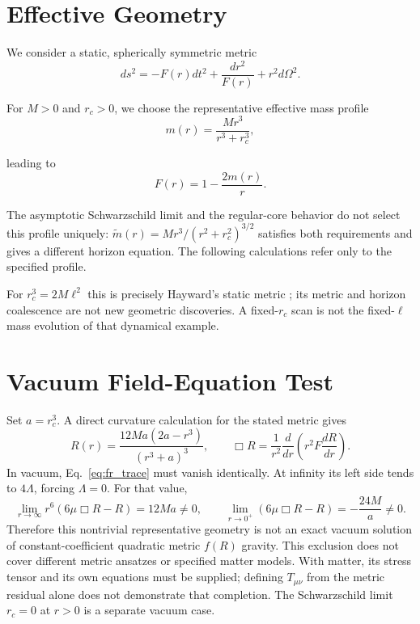 \documentclass[11pt,final]{article}
\begin{document}
\section{Effective Geometry}

We consider a static, spherically symmetric metric
\begin{equation}
ds^2=-F(r)dt^2+\frac{dr^2}{F(r)}+r^2d\Omega^2.
\end{equation}

For $M>0$ and $r_c>0$, we choose the representative effective mass profile
\begin{equation}
m(r)=\frac{Mr^3}{r^3+r_c^3},
\end{equation}

leading to
\begin{equation}
F(r)=1-\frac{2m(r)}{r}.
\end{equation}


The asymptotic Schwarzschild limit and the regular-core behavior do not select
this profile uniquely: $\widetilde m(r)=Mr^3/(r^2+r_c^2)^{3/2}$ satisfies both
requirements and gives a different horizon equation. The following calculations
refer only to the specified profile.

For $r_c^3=2M\ell^2$ this is precisely Hayward's static metric
\cite{hayward2006}; its metric and horizon coalescence are not new geometric
discoveries. A fixed-$r_c$ scan is not the fixed-$\ell$ mass evolution of that
dynamical example.

\section{Vacuum Field-Equation Test}

Set $a=r_c^3$. A direct curvature calculation for the stated metric gives
\begin{equation}
R(r)=\frac{12Ma(2a-r^3)}{(r^3+a)^3},\qquad
\Box R=\frac{1}{r^2}\frac{d}{dr}\left(r^2F\frac{dR}{dr}\right).
\end{equation}
In vacuum, Eq.~\eqref{eq:fr_trace} must vanish identically. At infinity its
left side tends to $4\Lambda$, forcing $\Lambda=0$. For that value,
\begin{equation}
\lim_{r\to\infty}r^6(6\mu\Box R-R)=12Ma\ne0,
\qquad
\lim_{r\to0^+}(6\mu\Box R-R)=-\frac{24M}{a}\ne0.
\end{equation}
Therefore this nontrivial representative geometry is not an exact vacuum
solution of constant-coefficient quadratic metric $f(R)$ gravity.
This exclusion does not cover different metric ansatzes or specified matter
models. With matter, its stress tensor and its own equations must be supplied;
defining $T_{\mu\nu}$ from the metric residual alone does not demonstrate that
completion. The Schwarzschild limit $r_c=0$ at $r>0$ is a separate vacuum case.
\end{document}
